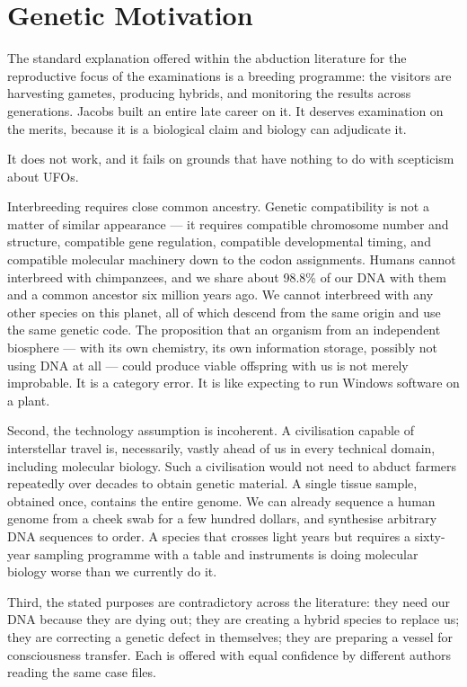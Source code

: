 \section{Genetic Motivation}\label{sec:geneticmotivation}

The standard explanation offered within the abduction literature for the reproductive focus of
the examinations is a breeding programme: the visitors are harvesting gametes, producing
hybrids, and monitoring the results across generations. Jacobs built an entire late career on
it. It deserves examination on the merits, because it is a biological claim and biology can
adjudicate it.

It does not work, and it fails on grounds that have nothing to do with scepticism about UFOs.

Interbreeding requires close common ancestry. Genetic compatibility is not a matter of
similar appearance --- it requires compatible chromosome number and structure, compatible
gene regulation, compatible developmental timing, and compatible molecular machinery down to
the codon assignments. Humans cannot interbreed with chimpanzees, and we share about 98.8\% of
our DNA with them and a common ancestor six million years ago. We cannot interbreed with any
other species on this planet, all of which descend from the same origin and use the same
genetic code. The proposition that an organism from an independent biosphere --- with its own
chemistry, its own information storage, possibly not using DNA at all --- could produce
viable offspring with us is not merely improbable. It is a category error. It is like
expecting to run Windows software on a plant.

Second, the technology assumption is incoherent. A civilisation capable of interstellar travel
is, necessarily, vastly ahead of us in every technical domain, including molecular biology.
Such a civilisation would not need to abduct farmers repeatedly over decades to obtain genetic
material. A single tissue sample, obtained once, contains the entire genome. We can already
sequence a human genome from a cheek swab for a few hundred dollars, and synthesise
arbitrary DNA sequences to order. A species that crosses light years but requires a
sixty-year sampling programme with a table and instruments is doing molecular biology worse
than we currently do it.

Third, the stated purposes are contradictory across the literature: they need our DNA because
they are dying out; they are creating a hybrid species to replace us; they are correcting a
genetic defect in themselves; they are preparing a vessel for consciousness transfer. Each is
offered with equal confidence by different authors reading the same case files.

